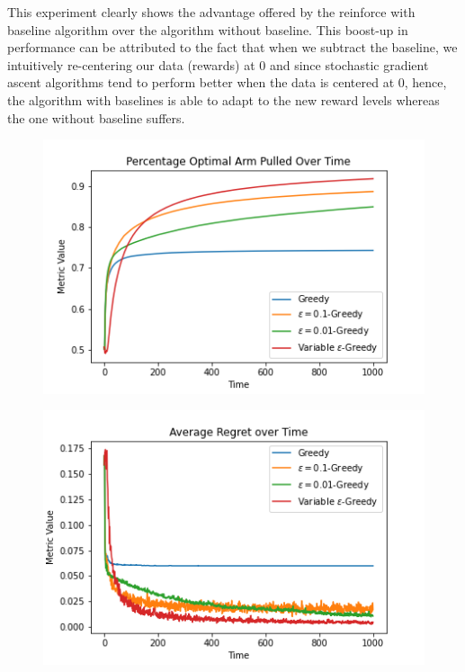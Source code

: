 \documentclass{article}
\begin{document}
	\noindent %
	
	This experiment clearly shows the advantage offered by the reinforce with baseline algorithm over the algorithm without baseline. This boost-up in performance
	can be attributed to the fact that when we subtract the baseline, we intuitively re-centering our data (rewards) at 0 and since stochastic gradient ascent algorithms
	tend to perform better when the data is centered at 0, hence, the algorithm with baselines is able to adapt to the new reward levels whereas the one without baseline
	suffers.
	
	\begin{figure}[H]
	\graphicspath{ {../Experiments/Interesting_Reinforce/} }
	\centering
	\begin{minipage}{.5\textwidth}
	  \centering
	  \includegraphics[width=\linewidth]{Percentage_Optimal_Arm_Pulled_Over_Time.png}
	  \label{percent_optimal}
	\end{minipage}%
	\begin{minipage}{.5\textwidth}
	  \centering
	  \includegraphics[width=\linewidth]{Average_Regret_over_Time.png}
	  \label{avg_regret}
	\end{minipage}
	\end{figure}
	
\end{document}
